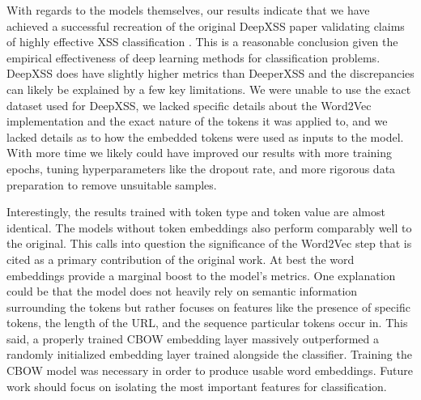 With regards to the models themselves, our results indicate that we have achieved a successful recreation of the original DeepXSS paper validating claims of highly effective XSS classification \cite{fang2018deepxss}. This is a reasonable conclusion given the empirical effectiveness of deep learning methods for classification problems. DeepXSS does have slightly higher metrics than DeeperXSS and the discrepancies can likely be explained by a few key limitations. We were unable to use the exact dataset used for DeepXSS, we lacked specific details about the Word2Vec implementation and the exact nature of the tokens it was applied to, and we lacked details as to how the embedded tokens were used as inputs to the model. With more time we likely could have improved our results with more training epochs, tuning hyperparameters like the dropout rate, and more rigorous data preparation to remove unsuitable samples.

Interestingly, the results trained with token type and token value are almost identical. The models without token embeddings also perform comparably well to the original.  This calls into question the significance of the Word2Vec step that is cited as a primary contribution of the original work. At best the word embeddings provide a marginal boost to the model’s metrics. One explanation could be that the model does not heavily rely on semantic information surrounding the tokens but rather focuses on features like the presence of specific tokens, the length of the URL, and the sequence particular tokens occur in. This said, a properly trained CBOW embedding layer massively outperformed a randomly initialized embedding layer trained alongside the classifier. Training the CBOW model was necessary in order to produce usable word embeddings. Future work should focus on isolating the most important features for classification.